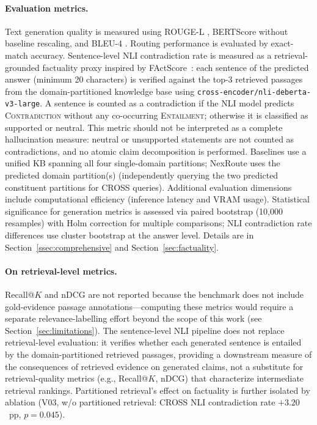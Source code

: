 \documentclass[a4paper,fleql,doubleblind]{cas-sc}
\begin{document}
\paragraph{Evaluation metrics.}
Text generation quality is measured using ROUGE-L \citep{lin2004rouge},
BERTScore \citep{zhang2020bertscore} without baseline rescaling, and BLEU-4
\citep{papineni2002bleu}. Routing performance is evaluated by exact-match
accuracy. Sentence-level NLI contradiction rate is measured as a retrieval-grounded factuality proxy inspired by FActScore~\citep{min2023factscore}: each sentence of the predicted answer (minimum 20 characters) is verified against the top-3 retrieved passages from the domain-partitioned knowledge base using \texttt{cross-encoder/nli-deberta-v3-large}. A sentence is counted as a contradiction if the NLI model predicts \textsc{Contradiction} without any co-occurring \textsc{Entailment}; otherwise it is classified as supported or neutral. This metric should not be interpreted as a complete hallucination measure: neutral or unsupported statements are not counted as contradictions, and no atomic claim decomposition is performed. Baselines use a unified KB spanning all four single-domain partitions; NexRoute uses the predicted domain partition(s) (independently querying the two predicted constituent partitions for CROSS queries).
Additional evaluation dimensions include computational efficiency (inference
latency and VRAM usage).
Statistical significance for generation metrics is assessed via paired bootstrap
(10,000 resamples) with Holm correction for multiple comparisons; NLI contradiction rate
differences use cluster bootstrap at the answer level. Details are in
Section~\ref{ssec:comprehensive} and Section~\ref{sec:factuality}.

\paragraph{On retrieval-level metrics.}
Recall@$K$ and nDCG are not reported because the benchmark does not include
gold-evidence passage annotations---computing these metrics would require a
separate relevance-labelling effort beyond the scope of this work
(see Section~\ref{sec:limitations}).
The sentence-level NLI pipeline does not replace retrieval-level evaluation:
it verifies whether each generated sentence is entailed by the domain-partitioned
retrieved passages, providing a downstream measure of the consequences of retrieved
evidence on generated claims, not a substitute for retrieval-quality metrics
(e.g., Recall@$K$, nDCG) that characterize intermediate retrieval rankings.
Partitioned retrieval's effect on factuality is further isolated by ablation
(V03, w/o partitioned retrieval: CROSS NLI contradiction rate $+3.20$~pp, $p{=}0.045$).
\end{document}
